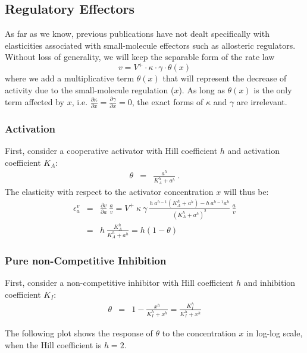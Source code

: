 \documentclass[12pt,a4paper]{article}
\begin{document}
\subsection{Regulatory Effectors}
As far as we know, previous publications have not dealt specifically with elasticities associated with small-molecule effectors such as allosteric regulators. Without loss of generality, we will keep the separable form of the rate law
\[v = V^+ \cdot \kappa \cdot \gamma \cdot \theta(x)\]
where we add a multiplicative term $\theta(x)$ that will represent the decrease of activity due to the small-molecule regulation ($x$). As long as $\theta(x)$ is the only term affected by $x$, i.e. $\frac{\partial \kappa}{\partial x} = \frac{\partial \gamma}{\partial x} = 0$, the exact forms of $\kappa$ and $\gamma$ are irrelevant.

\subsubsection{Activation}
First, consider a cooperative \cite{Barcroft1910-rx, Monod1965-dq} activator with Hill coefficient $h$ and activation coefficient $K_A$:
\begin{eqnarray}
    \theta &=& \frac{a^h}{K_A^h + a^h}~.
\end{eqnarray}
The elasticity with respect to the activator concentration $x$ will thus be:
\begin{eqnarray}
    \epsilon_a^v &=& \frac{\partial v}{\partial a} ~ \frac{a}{v} = V^+ ~ \kappa ~ \gamma ~ \frac{h~a^{h-1} (K_A^h + a^h) - h~a^{h-1} a^h}{(K_A^h + a^h)^2}~\frac{a}{v} \nonumber \\
    &=& h~\frac{K_A^h}{K_A^h + a^h} = h (1 - \theta) \label{eq:eps_act}
\end{eqnarray}

\subsubsection{Pure non-Competitive Inhibition}
First, consider a non-competitive inhibitor with Hill coefficient $h$ and inhibition coefficient $K_I$:
\begin{eqnarray}
    \theta &=& 1 - \frac{x^h}{K_I^h + x^h} = \frac{K_I^h}{K_I^h + x^h}
\end{eqnarray}

The following plot shows the response of $\theta$ to the concentration $x$ in log-log scale, when the Hill coefficient is $h = 2$.

\begin{center}
\end{center}
\end{document}
